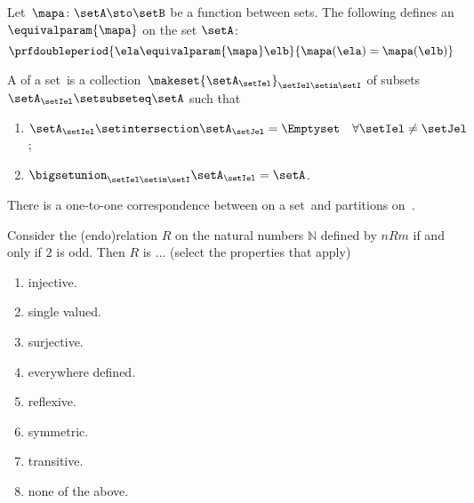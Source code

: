 \begin{example}
    Let~$\mapa\colon \setA \sto \setB$ be a function between sets.
    The following defines an  $\equivalparam{\mapa}$ on the set $\setA$:
    \begin{equation}
        \prfdoubleperiod{
            \ela\equivalparam{\mapa} \elb
        }{
            \mapa(\ela)=\mapa(\elb)
        }
    \end{equation}
\end{example}

\begin{ctdefinition}[Partition]
    \label{def:partition}
    A  of a set~\setA is a collection~$\makeset{\setA_\setIel}_{\setIel\setin \setI}$ of subsets~$\setA_\setIel\setsubseteq \setA$ such that
    \begin{enumerate}
        \item $\setA_\setIel\setintersection \setA_\setJel=\Emptyset \quad \forall \setIel\neq \setJel$;
        \item $\bigsetunion_{\setIel\setin \setI}\setA_\setIel=\setA$.
    \end{enumerate}
\end{ctdefinition}

\begin{remark}
    There is a one-to-one correspondence between  on a set~\setA and partitions on~\setA.
\end{remark}

\begin{quiz}
Consider the (endo)relation $R$ on the natural numbers $\mathbb{N}$ defined by $nRm$ if and only if $2$ is odd. Then $R$ is ... (select the properties that apply)
\begin{enumerate}[label=(\alph*)]
\item injective.
\item single valued.
\item surjective.
\item everywhere defined.
\item reflexive.
\item symmetric.
\item transitive.
\item none of the above.
\end{enumerate}
\end{quiz}

\begin{marginfigure}
    \centering
    \caption{
        \label{fig:info_network}
    }
\end{marginfigure}

